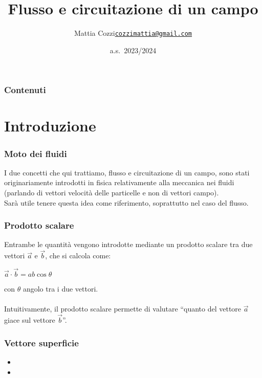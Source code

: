 \documentclass[]{beamer}
\title{Flusso e circuitazione di un campo}
\author{\texorpdfstring{Mattia Cozzi\newline\href{mailto:cozzimattia@gmail.com}{\texttt{cozzimattia@gmail.com}}}{Mattia Cozzi}}
\date{a.s.~2023/2024}
\theoremstyle{plain}
\begin{document}
\begin{frame}
  \titlepage
\end{frame}





\begin{frame}
\frametitle{Contenuti}
\tableofcontents
\end{frame}

\section{Introduzione}

\begin{frame}
\frametitle{Moto dei fluidi}
  I due concetti che qui trattiamo, \alert{flusso} e \alert{circuitazione} di un campo, sono stati originariamente introdotti in fisica relativamente alla meccanica nei fluidi (parlando di vettori velocità delle particelle e non di vettori campo).\\Sarà utile tenere questa idea come riferimento, soprattutto nel caso del flusso.
\end{frame}



\begin{frame}
\frametitle{Prodotto scalare}
Entrambe le quantità vengono introdotte mediante un \alert<1>{prodotto scalare tra due vettori $ \vec{a} $ e $ \vec{b} $}, che si calcola come:
  \begin{center}
  $ \vec{a} \cdot \vec{b} = a b \cos\theta $
  \end{center}
  con $ \theta $ angolo tra i due vettori.\\\pause~\\
  Intuitivamente, il prodotto scalare permette di valutare ``quanto del vettore $ \vec{a} $ giace sul vettore $ \vec{b} $''.
\end{frame}


\begin{frame}
\frametitle{Vettore superficie}
  \begin{itemize}
    \item {}
    \item {} 
  \end{itemize}
  
  \begin{figure}
\end{figure}

\end{frame}
\end{document}
